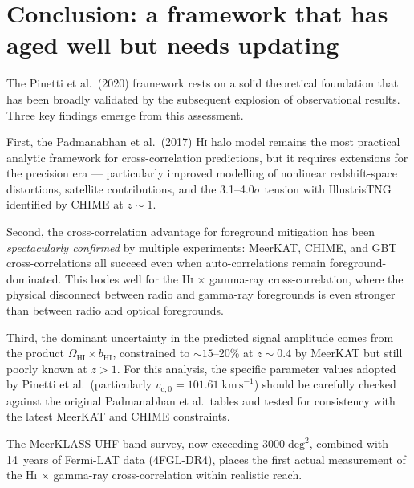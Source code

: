 \documentclass[10pt,a4paper]{article}
\newcommand{\OmHI}{\Omega_{\mathrm{HI}}}
\newcommand{\bHI}{b_{\mathrm{HI}}}
\newcommand{\vczero}{v_{\mathrm{c},0}}
\begin{document}
\section{Conclusion: a framework that has aged well but needs updating}
\label{sec:conclusion}

The Pinetti et al.\ (2020) framework rests on a solid theoretical foundation
that has been broadly validated by the subsequent explosion of observational
results.  Three key findings emerge from this assessment.

First, the Padmanabhan et al.\ (2017) H\textsc{i} halo model remains the
most practical analytic framework for cross-correlation predictions, but it
requires extensions for the precision era --- particularly improved modelling
of nonlinear redshift-space distortions, satellite contributions, and the
3.1--4.0$\sigma$ tension with IllustrisTNG identified by CHIME at $z \sim 1$.

Second, the cross-correlation advantage for foreground mitigation has been
\emph{spectacularly confirmed} by multiple experiments: MeerKAT, CHIME, and
GBT cross-correlations all succeed even when auto-correlations remain
foreground-dominated.  This bodes well for the H\textsc{i} $\times$ gamma-ray
cross-correlation, where the physical disconnect between radio and gamma-ray
foregrounds is even stronger than between radio and optical foregrounds.

Third, the dominant uncertainty in the predicted signal amplitude comes from
the product $\OmHI \times \bHI$, constrained to $\sim\!15$--20\% at
$z \sim 0.4$ by MeerKAT but still poorly known at $z > 1$.  For this
analysis, the specific parameter values adopted by Pinetti et al.\
(particularly $\vczero = 101.61\;\mathrm{km\,s}^{-1}$) should be carefully
checked against the original Padmanabhan et al.\ tables and tested for
consistency with the latest MeerKAT and CHIME constraints.

The MeerKLASS UHF-band survey, now exceeding $3000\;\mathrm{deg}^{2}$,
combined with 14~years of Fermi-LAT data (4FGL-DR4), places the first actual
measurement of the H\textsc{i} $\times$ gamma-ray cross-correlation within
realistic reach.


\end{document}
